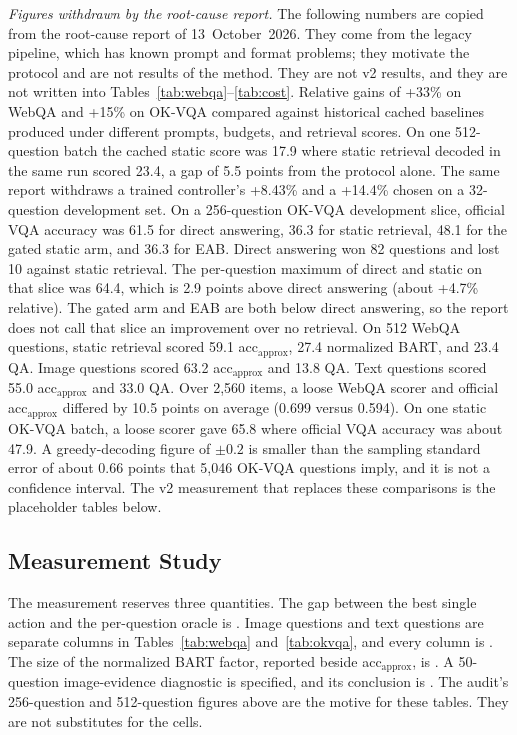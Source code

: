 \textit{Figures withdrawn by the root-cause report.}
The following numbers are copied from the root-cause report of 13~October~2026.
They come from the legacy pipeline, which has known prompt and format problems; they motivate the protocol and are not results of the method. They are not v2 results, and they are not written into Tables~\ref{tab:webqa}--\ref{tab:cost}.
Relative gains of +33\% on WebQA and +15\% on OK-VQA compared against historical cached baselines produced under different prompts, budgets, and retrieval scores. On one 512-question batch the cached static score was 17.9 where static retrieval decoded in the same run scored 23.4, a gap of 5.5 points from the protocol alone.
The same report withdraws a trained controller's +8.43\% and a +14.4\% chosen on a 32-question development set.
On a 256-question OK-VQA development slice, official VQA accuracy was 61.5 for direct answering, 36.3 for static retrieval, 48.1 for the gated static arm, and 36.3 for EAB.
Direct answering won 82 questions and lost 10 against static retrieval.
The per-question maximum of direct and static on that slice was 64.4, which is 2.9 points above direct answering (about +4.7\% relative).
The gated arm and EAB are both below direct answering, so the report does not call that slice an improvement over no retrieval.
On 512 WebQA questions, static retrieval scored 59.1 acc$_{\mathrm{approx}}$, 27.4 normalized BART, and 23.4 QA.
Image questions scored 63.2 acc$_{\mathrm{approx}}$ and 13.8 QA.
Text questions scored 55.0 acc$_{\mathrm{approx}}$ and 33.0 QA.
Over 2{,}560 items, a loose WebQA scorer and official acc$_{\mathrm{approx}}$ differed by 10.5 points on average (0.699 versus 0.594).
On one static OK-VQA batch, a loose scorer gave 65.8 where official VQA accuracy was about 47.9.
A greedy-decoding figure of $\pm 0.2$ is smaller than the sampling standard error of about 0.66 points that 5{,}046 OK-VQA questions imply, and it is not a confidence interval.
The v2 measurement that replaces these comparisons is the placeholder tables below.

\subsection{Measurement Study}
\label{sec:measure}
The measurement reserves three quantities.
The gap between the best single action and the per-question oracle is \ph{}.
Image questions and text questions are separate columns in Tables~\ref{tab:webqa} and~\ref{tab:okvqa}, and every column is \ph{}.
The size of the normalized BART factor, reported beside acc$_{\mathrm{approx}}$, is \ph{}.
A 50-question image-evidence diagnostic is specified, and its conclusion is \ph{}.
The audit's 256-question and 512-question figures above are the motive for these tables.
They are not substitutes for the cells.

